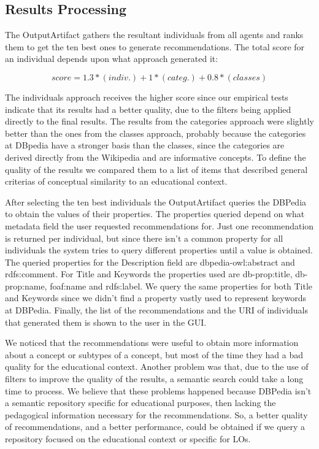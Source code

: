 \documentclass[a4paper,twoside]{article}
\begin{document}
\subsection{Results Processing}

\noindent The OutputArtifact gathers the resultant individuals from all agents and ranks them to get the ten best ones to generate recommendations. The total score for an individual depends upon what approach generated it:

\begin{equation}\label{eqX}
score = 1.3*(indiv.) + 1*(categ.) + 0.8*(classes)
\end{equation}

The individuals approach receives the higher score since our empirical tests indicate that its results had a better quality, due to the filters being applied directly to the final results. The results from the categories approach were slightly better than the ones from the classes approach, probably because the categories at DBpedia have a stronger basis than the classes, since the categories are derived directly from the Wikipedia and are informative concepts. To define the quality of the results we compared them to a list of items that described general criterias of conceptual similarity to an educational context.

After selecting the ten best individuals the OutputArtifact queries the DBPedia to obtain the values of their properties. The properties queried depend on what metadata field the user requested recommendations for. Just one recommendation is returned per individual, but since there isn't a common property for all individuals the system tries to query different properties until a value is obtained. The queried properties for the Description field are dbpedia-owl:abstract and rdfs:comment. For Title and Keywords the properties used are db-prop:title, db-prop:name, foaf:name and rdfs:label. We query the same properties for both Title and Keywords since we didn't find a property vastly used to represent keywords at DBPedia. Finally, the list of the recommendations and the URI of individuals that generated them is shown to the user in the GUI.

We noticed that the recommendations were useful to obtain more information about a concept or subtypes of a concept, but most of the time they had a bad quality for the educational context. Another problem was that, due to the use of filters to improve the quality of the results, a semantic search could take a long time to process. We believe that these problems happened because DBPedia isn't a semantic repository specific for educational purposes, then lacking the pedagogical information necessary for the recommendations. So, a better quality of recommendations, and a better performance, could be obtained if we query a repository focused on the educational context or specific for LOs.
\end{document}
